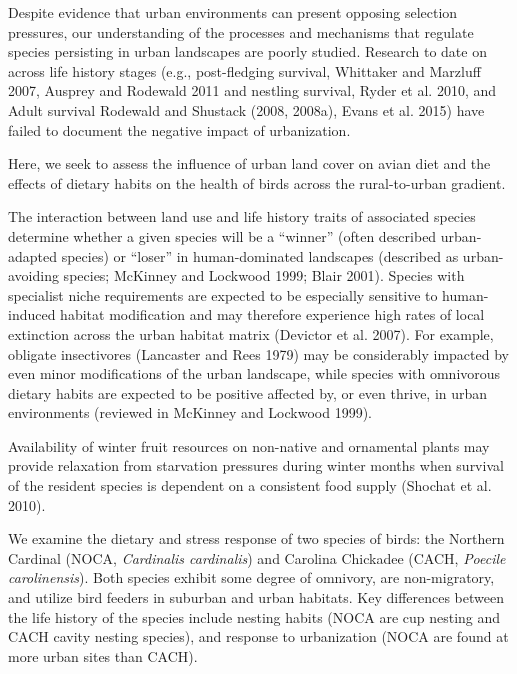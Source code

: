 \documentclass[12pt]{article}
\begin{document}
Despite evidence that urban environments can present opposing selection pressures, our understanding of the processes and mechanisms that regulate species persisting in urban landscapes are poorly studied. Research to date on across life history stages (e.g., post-fledging survival, Whittaker and Marzluff 2007, Ausprey and Rodewald 2011 and nestling survival, Ryder et al. 2010, and Adult survival Rodewald and Shustack (2008, 2008a), Evans et al. 2015) have failed to document the negative impact of urbanization. 


\par
Here, we seek to assess the influence of urban land cover on avian diet and the effects of dietary habits on the health of birds across the rural-to-urban gradient.

The interaction between land use and life history traits of associated species determine whether a given species will be a “winner” (often described urban-adapted species) or “loser” in human-dominated landscapes (described as urban-avoiding species; McKinney and Lockwood 1999; Blair 2001).  Species with specialist niche requirements are expected to be especially sensitive to human-induced habitat modification and may therefore experience high rates of local extinction across the urban habitat matrix (Devictor et al. 2007). For example, obligate insectivores (Lancaster and Rees 1979) may be considerably impacted by even minor modifications of the urban landscape, while species with omnivorous dietary habits are expected to be positive affected by, or even thrive, in urban environments (reviewed in McKinney and Lockwood 1999). 

Availability of winter fruit resources on non-native and ornamental plants may provide relaxation from starvation pressures during winter months when survival of the resident species is dependent on a consistent food supply (Shochat et al. 2010).


\par
We examine the dietary and stress response of two species of birds: the Northern Cardinal (NOCA, \textit{Cardinalis cardinalis}) and Carolina Chickadee (CACH, \textit{Poecile carolinensis}). Both species exhibit some degree of omnivory, are non-migratory, and utilize bird feeders in suburban and urban habitats. Key differences between the life history of the species include nesting habits (NOCA are cup nesting and CACH cavity nesting species), and response to urbanization (NOCA are found at more urban sites than CACH).
\end{document}
